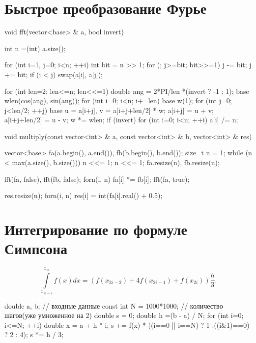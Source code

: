 \documentclass[12pt, titlepage]{article}
\begin{document}
\section{Быстрое преобразование Фурье}
\begin{cppcode}
void fft(vector<base> & a, bool invert) {
    int n =(int) a.size();

    for (int i=1, j=0; i<n; ++i) {
        int bit = n >> 1;
        for (; j>=bit; bit>>=1)
            j -= bit;
        j += bit;
        if (i < j)
            swap(a[i], a[j]);
    }

    for (int len=2; len<=n; len<<=1) {
        double ang = 2*PI/len *(invert ? -1 : 1);
        base wlen(cos(ang), sin(ang));
        for (int i=0; i<n; i+=len) {
            base w(1);
            for (int j=0; j<len/2; ++j) {
                base u = a[i+j],  v = a[i+j+len/2] * w;
                a[i+j] = u + v;
                a[i+j+len/2] = u - v;
                w *= wlen;
            }
        }
    }
    if (invert)
        for (int i=0; i<n; ++i)
            a[i] /= n;
}

void multiply(const vector<int> & a, const vector<int> & b, vector<int> & res) {
    vector<base> fa(a.begin(), a.end()), fb(b.begin(), b.end());
    size_t n = 1;
    while (n < max(a.size(), b.size()))  n <<= 1;
    n <<= 1;
    fa.resize(n), fb.resize(n);

    fft(fa, false), fft(fb, false);
    forn(i, n)
        fa[i] *= fb[i];
    fft(fa, true);

    res.resize(n);
    forn(i, n)
        res[i] = int(fa[i].real() + 0.5);
}
\end{cppcode}

\section{Интегрирование по формуле Симпсона}

\begin{equation*}
\int\limits_{x_{2i-2}}^{x_{2i}} f(x) dx = \left( f(x_{2i-2})+4f(x_{2i-1}) + f(x_{2i})\right) \frac{h}{3}.
\end{equation*}

\begin{cppcode}
double a, b; // входные данные
const int N = 1000*1000; // количество шагов(уже умноженное на 2)
double s = 0;
double h =(b - a) / N;
for (int i=0; i<=N; ++i) {
    double x = a + h * i;
    s += f(x) * ((i==0 || i==N) ? 1 :((i&1)==0) ? 2 : 4);
}
s *= h / 3;
\end{cppcode}
\end{document}
